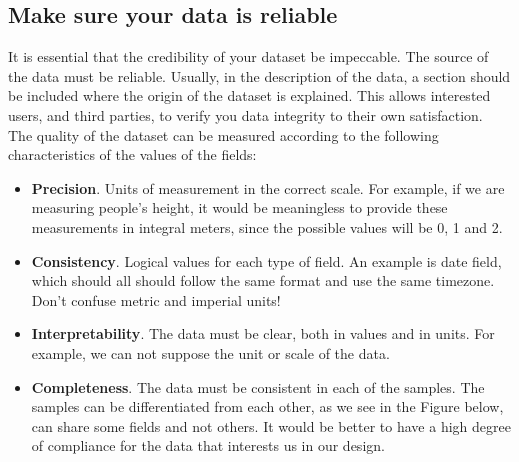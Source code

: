 \subsection{Make sure your data is reliable}

It is essential that the credibility of your dataset be impeccable. The source of the data must be reliable.
Usually, in the description of the data, a section should be included where the origin of the dataset is explained.
This allows interested users, and third parties, to verify you data integrity to their own satisfaction. \\

The quality of the dataset can be measured according to the following characteristics of the values of the fields:

\begin{itemize}
    \item \textbf{Precision}. Units of measurement in the correct scale. For example, if we are measuring people's height, it 
    would be meaningless to provide these measurements in integral meters, since the possible values will be 0, 1 and 2. \\

    \item \textbf{Consistency}. Logical values for each type of field. An example is date field, which should all should
    follow the same format and use the same timezone. Don't confuse metric and imperial units!\\

    \item \textbf{Interpretability}. The data must be clear, both in values and in units. For example, we can not
    suppose the unit or scale of the data.

    \item \textbf{Completeness}. The data must be consistent in each of the samples. The samples can be differentiated
    from each other, as we see in the Figure below, can share some fields and not others. It would be
    better to have a high degree of compliance for the data that interests us in our design.
\end{itemize}

